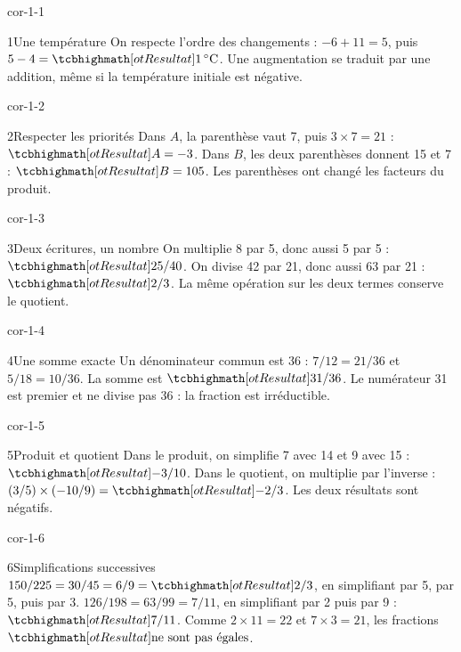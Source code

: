 \clearpage\pagestyle{otMain}\fontsize{11}{15}\selectfont{}
\begin{blocLivre}{cor-1-1}\begin{corrige}{1}{Une température}
On respecte l’ordre des changements : $-6+11=5$, puis $5-4=\res{1\,^\circ\mathrm C}$. Une augmentation se traduit par une addition, même si la température initiale est négative.
\end{corrige}\end{blocLivre}
\begin{blocLivre}{cor-1-2}\begin{corrige}{2}{Respecter les priorités}
Dans $A$, la parenthèse vaut 7, puis $3\times7=21$ : $\res{A=-3}$. Dans $B$, les deux parenthèses donnent 15 et 7 : $\res{B=105}$. Les parenthèses ont changé les facteurs du produit.
\end{corrige}\end{blocLivre}
\begin{blocLivre}{cor-1-3}\begin{corrige}{3}{Deux écritures, un nombre}
On multiplie 8 par 5, donc aussi 5 par 5 : $\res{25/40}$. On divise 42 par 21, donc aussi 63 par 21 : $\res{2/3}$. La même opération sur les deux termes conserve le quotient.
\end{corrige}\end{blocLivre}
\begin{blocLivre}{cor-1-4}\begin{corrige}{4}{Une somme exacte}
Un dénominateur commun est 36 : $7/12=21/36$ et $5/18=10/36$. La somme est $\res{31/36}$. Le numérateur 31 est premier et ne divise pas 36 : la fraction est irréductible.
\end{corrige}\end{blocLivre}
\begin{blocLivre}{cor-1-5}\begin{corrige}{5}{Produit et quotient}
Dans le produit, on simplifie 7 avec 14 et 9 avec 15 : $\res{-3/10}$. Dans le quotient, on multiplie par l’inverse : $(3/5)\times(-10/9)=\res{-2/3}$. Les deux résultats sont négatifs.
\end{corrige}\end{blocLivre}
\begin{blocLivre}{cor-1-6}\begin{corrige}{6}{Simplifications successives}
$150/225=30/45=6/9=\res{2/3}$, en simplifiant par 5, par 5, puis par 3. $126/198=63/99=7/11$, en simplifiant par 2 puis par 9 : $\res{7/11}$. Comme $2\times11=22$ et $7\times3=21$, les fractions $\res{\text{ne sont pas égales}}$.
\end{corrige}\end{blocLivre}
